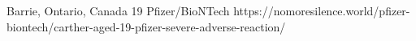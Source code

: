           {
            Barrie, Ontario, Canada
          }
          {
            19
          }
          {
            Pfizer/BioNTech
          }
          {
          }
          {
          }
          {
            https://nomoresilence.world/pfizer-biontech/carther-aged-19-pfizer-severe-adverse-reaction/
          }


